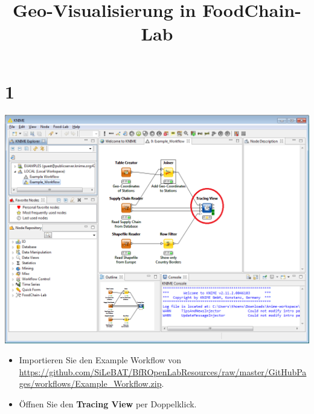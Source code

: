 \documentclass{beamer}
\title{Geo-Visualisierung in FoodChain-Lab}
\date{}
\begin{document}
\maketitle
 
\section{1}
\begin{frame}
	\begin{center}
  		\includegraphics[height=0.6\textheight]{1.png}
	\end{center}
	\begin{itemize}
		\item Importieren Sie den Example Workflow von \url{https://github.com/SiLeBAT/BfROpenLabResources/raw/master/GitHubPages/workflows/Example_Workflow.zip}.
		\item Öffnen Sie den \textbf{Tracing View} per Doppelklick.
	\end{itemize}
\end{frame}
\end{document}
